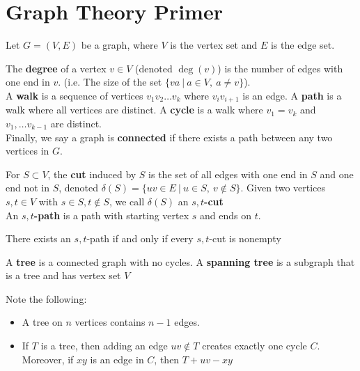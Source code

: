 \documentclass[../main.tex]{subfiles}
\begin{document}
\section{Graph Theory Primer}
Let $G = (V, E)$ be a graph, where $V$ is the vertex set and $E$ is the edge set.
\begin{definition}{}{}
   The \textbf{degree} of a vertex $v \in V$ (denoted $\deg(v)$) is the number of edges with one end in $v$. (i.e. The size of the set $\{ va \:\rvert\: a \in V, \ a \neq v \}$). \\

   A \textbf{walk} is a sequence of vertices $v_1v_2\ldots v_k$ where $v_iv_{i+1}$ is an edge. A \textbf{path} is a walk where all vertices are distinct. A \textbf{cycle} is a walk where $v_1 = v_k$ and $v_1, \ldots v_{k-1}$ are distinct. \\

   Finally, we say a graph is \textbf{connected} if there exists a path between any two vertices in $G$.
\end{definition}

\begin{definition}{}{}
  For $S \subset V$, the \textbf{cut} induced by $S$ is the set of all edges with one end in $S$ and one end not in $S$, denoted $\delta(S) = \{uv \in E \:\rvert\: u \in S, \ v \not\in S \}$. Given two vertices $s, t \in V$ with $s \in S, t \not\in S$, we call $\delta(S)$ an \textbf{$s,t$-cut} \\

  An \textbf{$s,t$-path} is a path with starting vertex $s$ and ends on $t$.
\end{definition}

\begin{theorem}{}{}
  There exists an $s,t$-path if and only if every $s,t$-cut is nonempty
\end{theorem}

\begin{definition}{}{}
  A \textbf{tree} is a connected graph with no cycles. A \textbf{spanning tree} is a subgraph that is a tree and has vertex set $V$
\end{definition}
Note the following:
\begin{itemize}
  \item A tree on $n$ vertices contains $n-1$ edges.
  \item If $T$ is a tree, then adding an edge $uv \not\in T$ creates exactly one cycle $C$. Moreover, if $xy$ is an edge in $C$, then $T + uv - xy$
\end{itemize}
\end{document}
